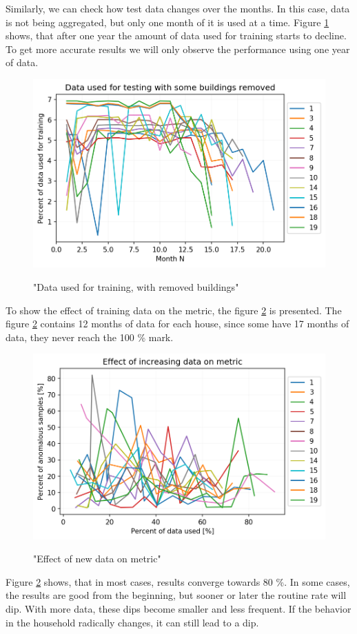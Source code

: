 Similarly, we can check how test data changes over the months. 
In this case, data is not being aggregated, but only one month of it is used at a time.
Figure \ref{fig:data_used_for_testing} shows, that after one year
the amount of data used for training starts to decline. 
To get more accurate results we will only observe the performance using one year of data. 

\begin{figure}[H]
	\centering
	\caption{"Data used for training, with removed buildings"}
	\includegraphics[width=.7\textwidth]{Figures/EC/DYN/data_used_for_testing.png}
	\label{fig:data_used_for_testing}
\end{figure}

To show the effect of training data on the metric, the figure \ref{fig:efect_of_data_on_metric} is presented.
The figure \ref{fig:efect_of_data_on_metric} contains 12 months of 
data for each house, since some have 17 months of data,
they never reach the 100 \% mark.

\begin{figure}[H]
	\centering
	\caption{"Effect of new data on metric"}
	\includegraphics[width=.7\textwidth]{Figures/EC/DYN/efect_of_data_on_metric.png}
	\label{fig:efect_of_data_on_metric}
\end{figure}

Figure \ref{fig:efect_of_data_on_metric} shows, that in most cases, results converge towards 80 \%. 
In some cases, the results are good from the beginning, but sooner or later the routine rate will dip. 
With more data, these dips become smaller and less frequent. 
If the behavior in the household radically changes, it can still lead to a dip.

